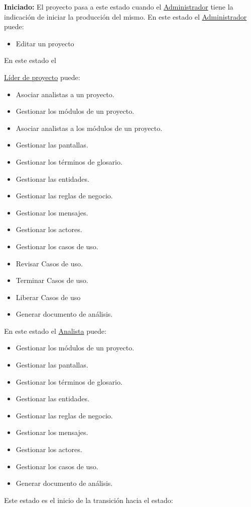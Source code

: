 {	\textbf{Iniciado:} El proyecto pasa a este estado cuando el \hyperlink{admin}{Administrador} tiene la indicación de iniciar la producción del mismo.
	En este estado el \hyperlink{admin}{Administrador} puede:
		\begin{itemize}
			\item Editar un proyecto
		\end{itemize}
	En este estado el {\hyperlink{jefe}{Líder de proyecto} puede:
		\begin{itemize}
			\item Asociar analistas a un proyecto.
			\item Gestionar los módulos de un proyecto.
			\item Asociar analistas a los módulos de un proyecto.
			\item Gestionar las pantallas.
			\item Gestionar los términos de glosario.
			\item Gestionar las entidades.
			\item Gestionar las reglas de negocio.
			\item Gestionar los mensajes.
			\item Gestionar los actores.
			\item Gestionar los casos de uso.
			\item Revisar Casos de uso.
			\item Terminar Casos de uso.
			\item Liberar Casos de uso
			\item Generar documento de análisis.
		\end{itemize}
	En este estado el \hyperlink{analista}{Analista} puede:
	\begin{itemize}
		\item Gestionar los módulos de un proyecto.
		\item Gestionar las pantallas.
		\item Gestionar los términos de glosario.
		\item Gestionar las entidades.
		\item Gestionar las reglas de negocio.
		\item Gestionar los mensajes.
		\item Gestionar los actores.
		\item Gestionar los casos de uso.
		\item Generar documento de análisis.
	\end{itemize}
	Este estado es el inicio de la transición hacia el estado:
	\begin{itemize}

\end{itemize}}}
